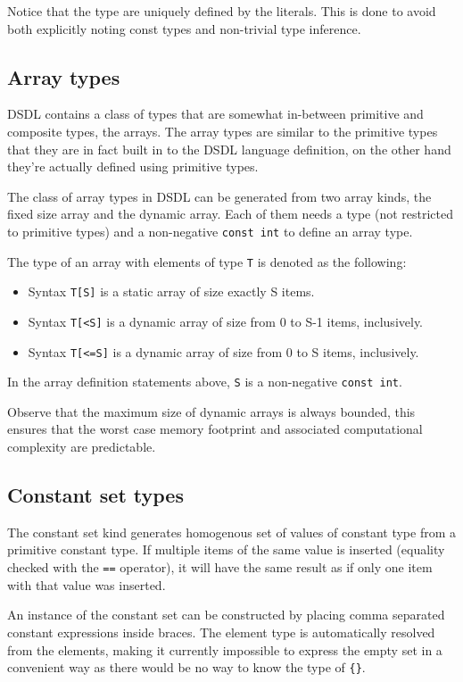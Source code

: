 Notice that the type are uniquely defined by the literals.
This is done to avoid both explicitly noting const types and non-trivial type inference.


\subsection{Array types}\label{sec:dsdl_array_data_types}
DSDL contains a class of types that are somewhat in-between primitive and composite types, the arrays.
The array types are similar to the primitive types that they are in fact built in to the DSDL language definition,
on the other hand they're actually defined using primitive types.

The class of array types in DSDL can be generated from two array kinds, the fixed size array and the dynamic array.
Each of them needs a type (not restricted to primitive types)
and a non-negative \texttt{const int} to define an array type.

The type of an array with elements of type \verb|T| is denoted as the following:
\begin{itemize}
    \item Syntax \verb|T[S]| is a static array of size exactly S items.
    \item Syntax \verb|T[<S]| is a dynamic array of size from 0 to S-1 items, inclusively.
    \item Syntax \verb|T[<=S]| is a dynamic array of size from 0 to S items, inclusively.
\end{itemize}

In the array definition statements above, \verb|S| is a non-negative \verb|const int|.

Observe that the maximum size of dynamic arrays is always bounded,
this ensures that the worst case memory footprint and associated computational complexity are predictable.

\subsection{Constant set types}
The constant set kind generates homogenous set of values of constant type from a primitive constant type.
If multiple items of the same value is inserted (equality checked with the \verb|==| operator),
it will have the same result as if only one item with that value was inserted.

An instance of the constant set can be constructed by placing comma separated constant expressions inside braces.
The element type is automatically resolved from the elements,
making it currently impossible to express the empty set in a convenient way as
there would be no way to know the type of \verb|{}|.

